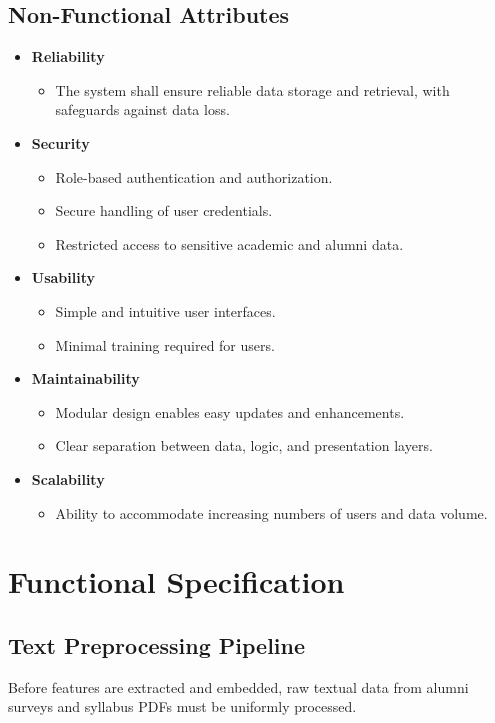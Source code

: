 \subsection{Non-Functional Attributes}
\begin{itemize}
    \item \textbf{Reliability}
    \begin{itemize}
        \item The system shall ensure reliable data storage and retrieval, with safeguards against data loss.
    \end{itemize}
    \item \textbf{Security}
    \begin{itemize}
        \item Role-based authentication and authorization.
        \item Secure handling of user credentials.
        \item Restricted access to sensitive academic and alumni data.
    \end{itemize}
    \item \textbf{Usability}
    \begin{itemize}
        \item Simple and intuitive user interfaces.
        \item Minimal training required for users.
    \end{itemize}
    \item \textbf{Maintainability}
    \begin{itemize}
        \item Modular design enables easy updates and enhancements.
        \item Clear separation between data, logic, and presentation layers.
    \end{itemize}
    \item \textbf{Scalability}
    \begin{itemize}
        \item Ability to accommodate increasing numbers of users and data volume.
    \end{itemize}
\end{itemize}

\section{Functional Specification}

\subsection{Text Preprocessing Pipeline}
Before features are extracted and embedded, raw textual data from alumni surveys and syllabus PDFs must be uniformly processed.

